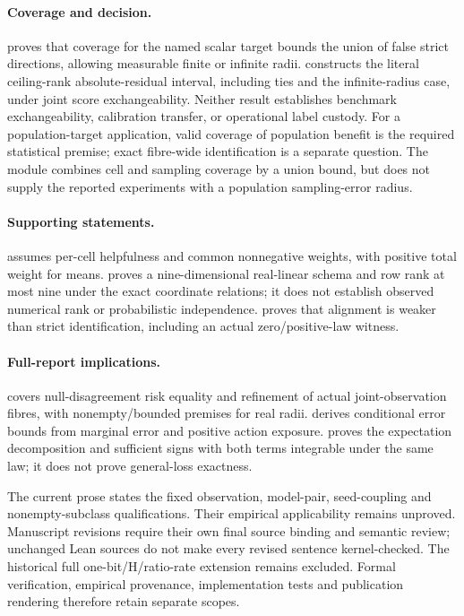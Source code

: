 \paragraph{Coverage and decision.}
 proves that
coverage for the named scalar target bounds the union of false strict
directions, allowing measurable finite or infinite radii.
 constructs the literal
ceiling-rank absolute-residual interval, including ties and the infinite-radius
case, under joint score exchangeability. Neither result establishes benchmark
exchangeability, calibration transfer, or operational label custody. For a
population-target application, valid coverage of population benefit is the
required statistical premise; exact fibre-wide identification is a separate
question. The  module combines cell and sampling
coverage by a union bound, but does not supply the reported experiments with
a population sampling-error radius.

\paragraph{Supporting statements.}
 assumes per-cell helpfulness and common nonnegative
weights, with positive total weight for means.  proves a
nine-dimensional real-linear schema and row rank at most nine under the exact
coordinate relations; it does not establish observed numerical rank or
probabilistic independence.  proves that alignment is
weaker than strict identification, including an actual zero/positive-law witness.

\paragraph{Full-report implications.}
 covers null-disagreement risk equality and
refinement of actual joint-observation fibres, with nonempty/bounded premises
for real radii.  derives conditional error bounds
from marginal error and positive action exposure. 
proves the expectation decomposition and sufficient signs with both terms
integrable under the same law; it does not prove general-loss exactness.

The current prose states the fixed observation, model-pair, seed-coupling and
nonempty-subclass qualifications. Their empirical applicability remains
unproved. Manuscript revisions require their own final source binding and
semantic review; unchanged Lean sources do not make every revised sentence
kernel-checked. The historical full one-bit/H/ratio-rate extension remains
excluded. Formal verification, empirical provenance, implementation tests and
publication rendering therefore retain separate scopes.
